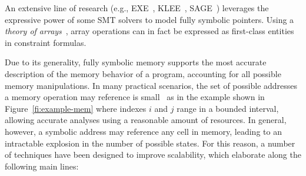 \begin{itemize}

\end{itemize}


An extensive line of research (e.g., {\sc EXE}~\cite{EXE-CCS06}, {\sc KLEE}~\cite{KLEE-OSDI08}, {\sc SAGE}~\cite{EGL-ISSTA09}) leverages the expressive power of some SMT solvers to model fully symbolic pointers. Using a {\em theory of arrays}~\cite{STP-CAV07}, array operations can in fact be expressed as first-class entities in constraint formulas.

Due to its generality, fully symbolic memory supports the most accurate description of the memory behavior of a program, accounting for all possible memory manipulations. In many practical scenarios, the set of possible addresses a memory operation may reference is small~\cite{BITBLAZE-ICISS08} as in the example shown in Figure~\ref{fi:example-mem} where indexes $i$ and $j$ range in a bounded interval, allowing accurate analyses using a reasonable amount of resources. In general, however, a symbolic address may reference any cell in memory, leading to an intractable explosion in the number of possible states. For this reason, a number of techniques have been designed to improve scalability, which elaborate along the following main lines:

